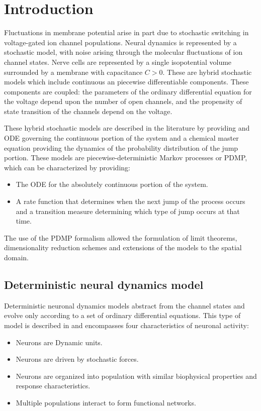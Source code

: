 \section{Introduction}
Fluctuations in membrane potential arise in part due to stochastic switching in voltage-gated ion channel populations.
Neural dynamics is represented by a stochastic model, with noise arising through the molecular fluctuations of ion channel states.
Nerve cells are represented by a single isopotential volume surrounded by a membrane with capacitance $C>0$.
These are hybrid stochastic models which include continuous an piecewise differentiable components.
These components are coupled: the parameters of the ordinary differential equation for the voltage depend upon the number of open channels, and the propensity of state transition of the channels depend on the voltage.

These hybrid stochastic models are described in the literature by providing and ODE governing the continuous portion of the system and a chemical master equation providing the dynamics of the probability distribution of the jump portion.
These models are piecewise-deterministic Markov processes or PDMP, which can be characterized by providing:

\begin{itemize}
	\item The ODE for the absolutely continuous portion of the system.
	\item A rate function that determines when the next jump of the process occurs and a transition measure determining which type of jump occurs at that time.
\end{itemize}

The use of the PDMP formalism allowed the formulation of limit theorems, dimensionality reduction schemes and extensions of the models to the spatial domain.

	\subsection{Deterministic neural dynamics model}
	Deterministic neuronal dynamics models abstract from the channel states and evolve only according to a set of ordinary differential equations.
	This type of model is described in \cite{stochastic-neuron} and encompasses four characteristics of neuronal activity:

	\begin{itemize}
		\item Neurons are Dynamic units.
		\item Neurons are driven by stochastic forces.
		\item Neurons are organized into population with similar biophysical properties and response characteristics.
		\item Multiple populations interact to form functional networks.
	\end{itemize}


